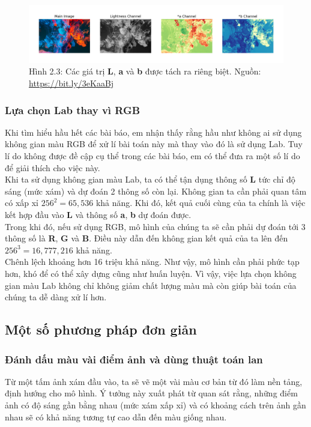 \documentclass[a4paper]{article}
\begin{document}
\begin{figure}[h!]
\centering
\includegraphics[width=16.1cm]{images/2_3.jpeg}
\caption{Hình 2.3: Các giá trị \textbf{L}, \textbf{a} và \textbf{b} được tách ra riêng biệt. Nguồn: \href{https://bit.ly/3eKaaBj}{https://bit.ly/3eKaaBj}}
\end{figure}

\subsubsection{Lựa chọn Lab thay vì RGB}
Khi tìm hiểu hầu hết các bài báo, em nhận thấy rằng hầu như không ai sử dụng không gian màu RGB để xử lí bài toán này mà thay vào đó là sử dụng Lab. Tuy lí do không được đề cập cụ thể trong các bài báo, em có thể đưa ra một số lí do để giải thích cho việc này.\\
Khi ta sử dụng không gian màu Lab, ta có thể tận dụng thông số \textbf{L} tức chỉ độ sáng (mức xám) và dự đoán 2 thông số còn lại. Không gian ta cần phải quan tâm có xấp xỉ $256^2 = 65,536$ khả năng. Khi đó, kết quả cuối cùng của ta chính là việc kết hợp đầu vào \textbf{L} và thông số \textbf{a}, \textbf{b} dự đoán được.\\ Trong khi đó, nếu sử dụng RGB, mô hình của chúng ta sẽ cần phải dự đoán tới 3 thông số là \textbf{R}, \textbf{G} và \textbf{B}. Điều này dẫn đến không gian kết quả của ta lên đến $256^3 = 16,777,216$ khả năng.\\
Chênh lệch khoảng hơn 16 triệu khả năng. Như vậy, mô hình cần phải phức tạp hơn, khó để có thể xây dựng cũng như huấn luyện. Vì vậy, việc lựa chọn không gian màu Lab không chỉ không giảm chất lượng màu mà còn giúp bài toán của chúng ta dễ dàng xử lí hơn.

\subsection{Một số phương pháp đơn giản}

\subsubsection{Đánh dấu màu vài điểm ảnh và dùng thuật toán lan}
Từ một tấm ảnh xám đầu vào, ta sẽ vẽ một vài màu cơ bản từ đó làm nền tảng, định hướng cho mô hình. Ý tưởng này xuất phát từ quan sát rằng, những điểm ảnh có độ sáng gần bằng nhau (mức xám xấp xỉ) và có khoảng cách trên ảnh gần nhau sẽ có khả năng tương tự cao dẫn đến màu giống nhau.
\end{document}
